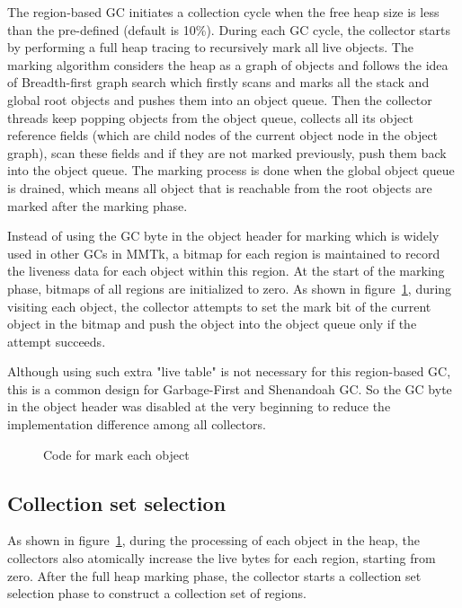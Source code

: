 The region-based GC initiates a collection cycle when the free heap size is less than
the pre-defined  (default is 10\%). During each GC cycle,
the collector starts by performing a full heap tracing to recursively mark all live objects.
The marking algorithm considers the heap as a graph of objects and follows the idea of Breadth-first graph search
which firstly scans and marks all the stack and global root objects and pushes them into an object queue.
Then the collector threads keep popping objects from the object queue, collects all its
object reference fields (which are child nodes of the current object node in the object graph), scan these
fields and if they are not marked previously, push them back into the object queue.
The marking process is done when the global object queue is drained, which means all object that is reachable
from the root objects are marked after the marking phase.

Instead of using the GC byte in the object header for marking which is widely used in other GCs in MMTk,
a bitmap for each region is maintained to record the liveness data for each object within this region.
At the start of the marking phase, bitmaps of all regions are initialized to zero.
As shown in figure~\ref{fig:tracemarkobject}, during visiting each object, the collector attempts to set the mark bit
of the current object in the bitmap and push the object into the object queue only if the attempt succeeds.

Although using such extra "live table" is not necessary for this region-based GC,
this is a common design for Garbage-First and Shenandoah GC.
So the GC byte in the object header was disabled at the very beginning to reduce the implementation difference among all collectors.

\begin{figure}
  \centering
  
  \caption{Code for mark each object}
  \label{fig:tracemarkobject}
\end{figure}

\subsection{Collection set selection}

As shown in figure~\ref{fig:tracemarkobject}, during the processing of each object in the heap,
the collectors also atomically increase the live bytes for each region, starting from zero.
After the full heap marking phase, the collector starts a collection set selection phase to construct
a collection set of regions.

